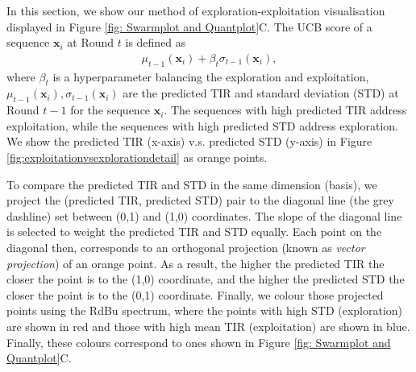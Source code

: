 \documentclass{scrartcl}[2013/05/29]%
\newcommand{\mengyan}[1]{\textcolor{magenta}{#1}}
\begin{document}
In this section, we show our method of exploration-exploitation visualisation displayed in Figure \ref{fig: Swarmplot and Quantplot}C.
The UCB score of a sequence $\mathbf{x}_i$ at Round $t$ is defined as 
\begin{align*}
    \mu_{t-1}(\mathbf{x}_i) + \beta_t \sigma_{t-1}(\mathbf{x}_i),
\end{align*}
where $\beta_t$ is a hyperparameter balancing the exploration and exploitation, 
$\mu_{t-1}(\mathbf{x}_i), \sigma_{t-1}(\mathbf{x}_i)$ are the predicted TIR and standard deviation (STD) at Round $t-1$ for the sequence $\mathbf{x}_i$.
The sequences with high predicted TIR address exploitation, while the sequences with high predicted STD address exploration. 
We show the predicted TIR (x-axis) v.s. predicted STD (y-axis) in Figure \ref{fig:exploitationvsexplorationdetail} as orange points. 

To compare the predicted TIR and STD in the same dimension (basis), we project the (predicted TIR, predicted STD) pair to the diagonal line (the grey dashline) set between (0,1) and (1,0) coordinates.
The slope of the diagonal line is selected to weight the predicted TIR and STD equally. 
Each point on the diagonal then, corresponds to an orthogonal projection (known as \emph{vector projection}) of an orange point.
As a result, the higher the predicted TIR the closer the point is to the (1,0) coordinate, and the higher the predicted STD the closer the point is to the (0,1) coordinate.
Finally, we colour those projected points using the RdBu spectrum, where the points with high STD (exploration) are shown in red and those with high mean TIR (exploitation) are shown in blue.
Finally, these colours correspond to ones shown in Figure \mbox{\ref{fig: Swarmplot and Quantplot}C}.

\end{document}
